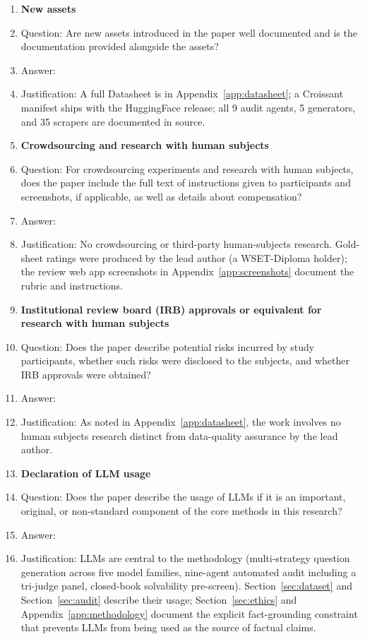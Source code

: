 \begin{enumerate}
\item {\bf New assets}
    \item[] Question: Are new assets introduced in the paper well documented and is the documentation provided alongside the assets?
    \item[] Answer: \answerYes{}
    \item[] Justification: A full Datasheet is in Appendix~\ref{app:datasheet}; a Croissant manifest \citep{koehn2024croissant} ships with the HuggingFace release; all 9 audit agents, 5 generators, and 35 scrapers are documented in source.

\item {\bf Crowdsourcing and research with human subjects}
    \item[] Question: For crowdsourcing experiments and research with human subjects, does the paper include the full text of instructions given to participants and screenshots, if applicable, as well as details about compensation?
    \item[] Answer: \answerNA{}
    \item[] Justification: No crowdsourcing or third-party human-subjects research. Gold-sheet ratings were produced by the lead author (a WSET-Diploma holder); the review web app screenshots in Appendix~\ref{app:screenshots} document the rubric and instructions.

\item {\bf Institutional review board (IRB) approvals or equivalent for research with human subjects}
    \item[] Question: Does the paper describe potential risks incurred by study participants, whether such risks were disclosed to the subjects, and whether IRB approvals were obtained?
    \item[] Answer: \answerNA{}
    \item[] Justification: As noted in Appendix~\ref{app:datasheet}, the work involves no human subjects research distinct from data-quality assurance by the lead author.

\item {\bf Declaration of LLM usage}
    \item[] Question: Does the paper describe the usage of LLMs if it is an important, original, or non-standard component of the core methods in this research?
    \item[] Answer: \answerYes{}
    \item[] Justification: LLMs are central to the methodology (multi-strategy question generation across five model families, nine-agent automated audit including a tri-judge panel, closed-book solvability pre-screen). Section~\ref{sec:dataset} and Section~\ref{sec:audit} describe their usage; Section~\ref{sec:ethics} and Appendix~\ref{app:methodology} document the explicit fact-grounding constraint that prevents LLMs from being used as the source of factual claims.

\end{enumerate}
